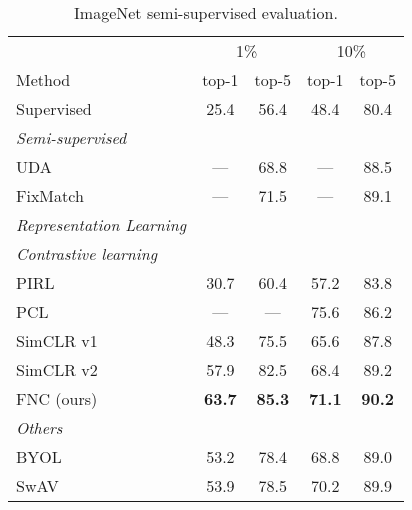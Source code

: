 \documentclass[10pt,twocolumn,letterpaper]{article}
\begin{document}
\begin{table}[!b]
\footnotesize
\centering
\begin{tabularx}{\linewidth}{Xcccc}
\toprule
& \multicolumn{2}{c}{1\%} & \multicolumn{2}{c}{10\%}\\
Method & top-1 & top-5 & top-1 & top-5\\
\midrule
Supervised & 25.4 & 56.4 & 48.4 & 80.4\\
\hline
\footnotesize{\textit{Semi-supervised}}  &&&&\\
UDA~\cite{xie2019unsupervised}& --- & 68.8 & --- & 88.5\\
FixMatch~\cite{sohn2020fixmatch} & --- & 71.5 & --- & 89.1\\
\hline
\footnotesize{\textit{Representation Learning}} &&&&\\
\hdashline
\footnotesize{\textit{Contrastive learning}} &&&&\\
PIRL~\cite{misra2019selfsupervised} & 30.7 & 60.4 & 57.2 & 83.8\\  
PCL~\cite{li2020prototypical} & --- & --- & 75.6 & 86.2\\
SimCLR v1~\cite{chen2020simple} & 48.3 & 75.5 & 65.6 & 87.8\\
SimCLR v2~\cite{chen2020big}& 57.9 & 82.5 & 68.4 & 89.2\\
FNC (ours) & \textbf{63.7} & \textbf{85.3} & \textbf{71.1} & \textbf{90.2} \\
\hdashline
\footnotesize{\textit{Others}} &&&&\\
BYOL~\cite{grill2020bootstrap} & 53.2 & 78.4 & 68.8 & 89.0 \\
SwAV~\cite{caron2020unsupervised} & 53.9 & 78.5 & 70.2 & 89.9 \\

\bottomrule
\end{tabularx}
\vspace{5pt}
\caption{ImageNet semi-supervised evaluation.}
\label{tab:imagenet_semisup_eval}
\end{table}
\iffalse
\end{document}
